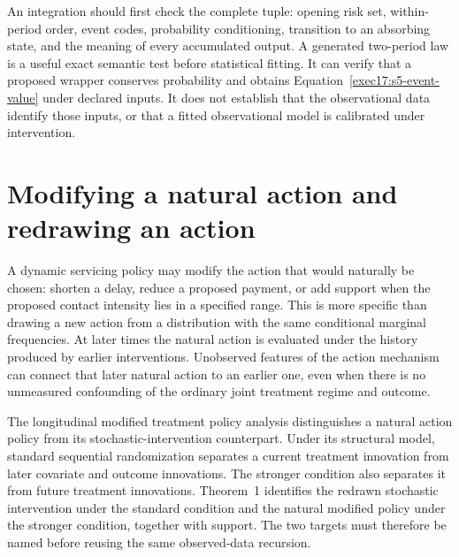 An integration should first check the complete tuple: opening risk set,
within-period order, event codes, probability conditioning, transition to an
absorbing state, and the meaning of every accumulated output. A generated
two-period law is a useful exact semantic test before statistical fitting.
It can verify that a proposed wrapper conserves probability and obtains
Equation~\eqref{exec17:s5-event-value} under declared inputs. It does not
establish that the observational data identify those inputs, or that a
fitted observational model is calibrated under intervention.

\section{Modifying a natural action and redrawing an action}
\label{exec17:s5-natural}

A dynamic servicing policy may modify the action that would naturally be
chosen: shorten a delay, reduce a proposed payment, or add support when the
proposed contact intensity lies in a specified range. This is more specific
than drawing a new action from a distribution with the same conditional
marginal frequencies. At later times the natural action is evaluated under
the history produced by earlier interventions. Unobserved features of the
action mechanism can connect that later natural action to an earlier one,
even when there is no unmeasured confounding of the ordinary joint treatment
regime and outcome.

The longitudinal modified treatment policy analysis distinguishes a natural
action policy from its stochastic-intervention counterpart. Under its
structural model, standard sequential randomization separates a current
treatment innovation from later covariate and outcome innovations. The
stronger condition also separates it from future treatment innovations.
Theorem~1 identifies the redrawn stochastic intervention under the standard
condition and the natural modified policy under the stronger condition,
together with support. The two targets must therefore be named before
reusing the same observed-data recursion.~\citep{lmtp2023}

